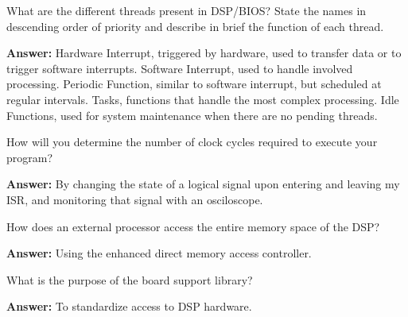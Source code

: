 \documentclass{article}
\begin{document}
\begin{enumerate}
  \begin{item}
    What are the different threads present in DSP/BIOS? State the names in descending order of priority and describe in brief the function of each thread.

  \textbf{Answer:}
    Hardware Interrupt, triggered by hardware, used to transfer data or to trigger software interrupts.
    Software Interrupt, used to handle involved processing.
    Periodic Function, similar to software interrupt, but scheduled at regular intervals.
    Tasks, functions that handle the most complex processing.
    Idle Functions, used for system maintenance when there are no pending threads.
  \end{item}

  \begin{item}
    How will you determine the number of clock cycles required to execute your program?

  \textbf{Answer:}
    By changing the state of a logical signal upon entering and leaving my ISR, and monitoring that signal with an osciloscope.
  \end{item}

  \begin{item}
    How does an external processor access the entire memory space of the DSP?

  \textbf{Answer:}
    Using the enhanced direct memory access controller.
  \end{item}

  \begin{item}
    What is the purpose of the board support library?

  \textbf{Answer:}
    To standardize access to DSP hardware.
  \end{item}
\end{enumerate}





\end{document}
